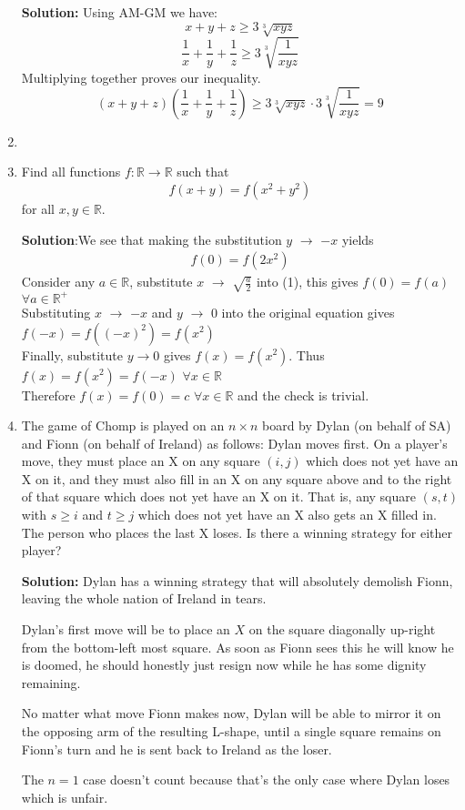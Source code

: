 \documentclass{article}
\begin{document}
\begin{enumerate}[itemsep=24pt]
\textbf{Solution:} 
Using AM-GM we have:
$$x+y+z \geq 3\sqrt[3]{xyz}$$
$$\frac{1}{x}+\frac{1}{y}+\frac{1}{z} \geq 3\sqrt[3]{\frac{1}{xyz}}$$
Multiplying together proves our inequality.
$$(x+y+z)(\frac{1}{x}+\frac{1}{y}+\frac{1}{z}) \geq 3\sqrt[3]{xyz}\cdot 3\sqrt[3]{\frac{1}{xyz}} = 9$$

\item 


\item
Find all functions $f : \mathbb{R} \to \mathbb{R}$ such that \[ f(x+y) = f(x^2+y^2) \] for all $x,y \in \mathbb{R}$.

\textbf{Solution}:We see that making the substitution $y$ $\rightarrow$ $-x$ yields 
\begin{align}
    f(0)=f(2x^{2})
\end{align}
Consider any $a \in \mathbb{R}$, substitute $x$ $\rightarrow$ $\sqrt{\frac{a}{2}}$ into (1), this gives $f(0) = f(a)$ $\forall a \in \mathbb{R^{+}}$
\\Substituting $x$ $\rightarrow$ $-x$ and $y$ $\rightarrow$ $0$ into the original equation gives $f(-x) = f((-x)^{2}) = f(x^{2})$
\\Finally, substitute $y \rightarrow 0$ gives $f(x) = f(x^{2})$. Thus $f(x)= f(x^{2}) = f(-x)$ $\forall x \in \mathbb{R}$
\\Therefore $f(x) = f(0) = c$ $\forall x \in \mathbb{R}$ and the check is trivial.

\item %
The game of Chomp is played on an $n \times n$ board by Dylan (on behalf of SA) and Fionn (on behalf of Ireland) as follows: Dylan moves first.
On a player's move, they must place an X on any square $(i, j)$ which does not yet have an X on it, and they must also fill in an X on any square above and to the right of that square which does not yet have an X on it.
That is, any square $(s, t)$ with $s \geq i$ and $t \geq j$ which does not yet have an X also gets an X filled in.
The person who places the last X loses.
Is there a winning strategy for either player?

\textbf{Solution:}
Dylan has a winning strategy that will absolutely demolish Fionn, leaving the whole nation of Ireland in tears. 

Dylan's first move will be to place an $X$ on the square diagonally up-right from the bottom-left most square. As soon as Fionn sees this he will know he is doomed, he should honestly just resign now while he has some dignity remaining.

No matter what move Fionn makes now, Dylan will be able to mirror it on the opposing arm of the resulting L-shape, until a single square remains on Fionn's turn and he is sent back to Ireland as the loser.

The $n=1$ case doesn't count because that's the only case where Dylan loses which is unfair.


\end{enumerate}
\end{document}
